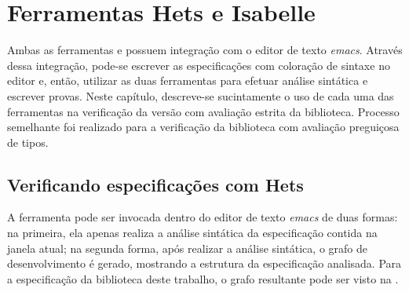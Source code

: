 \chapter{Ferramentas Hets e Isabelle}
\label{chap:hetseisabelle}

Ambas as ferramentas \Hets \cite{MossakowskiEtAl07b} e \Isabelle \cite{Nipkow-Paulson-Wenzel:2002} possuem integração com o editor de texto \textit{emacs}.
Através dessa integração, pode-se escrever as especificações com coloração de sintaxe no editor e, então, utilizar as duas ferramentas para efetuar análise sintática e escrever provas.
Neste capítulo, descreve-se sucintamente o uso de cada uma das ferramentas na verificação da versão com avaliação estrita da biblioteca.
Processo semelhante foi realizado para a verificação da biblioteca com avaliação preguiçosa de tipos.

\section{Verificando especificações com Hets}
A ferramenta \Hets pode ser invocada dentro do editor de texto \textit{emacs} de duas formas: na primeira, ela apenas realiza a análise sintática da especificação contida na janela atual; na segunda forma, após realizar a análise sintática, o grafo de desenvolvimento \cite{Mossakowski2006} é gerado, mostrando a estrutura da especificação analisada. Para a especificação da biblioteca deste trabalho, o grafo resultante pode ser visto na .

